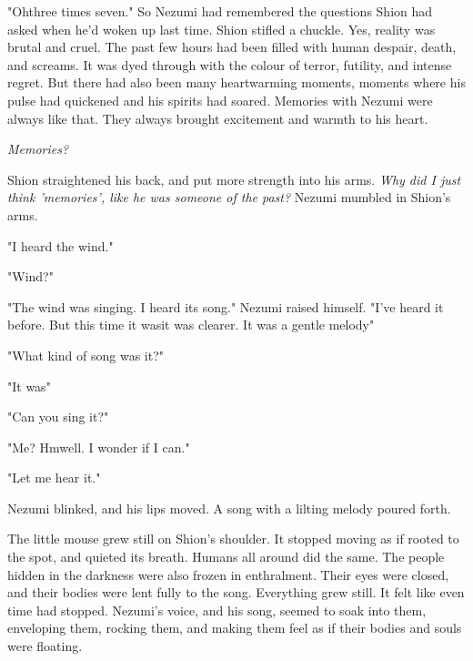"Oh\el three times seven." So Nezumi had remembered the questions Shion
had asked when he'd woken up last time. Shion stifled a chuckle. Yes,
reality was brutal and cruel. The past few hours had been filled with
human despair, death, and screams. It was dyed through with the colour
of terror, futility, and intense regret. But there had also been many
heartwarming moments, moments where his pulse had quickened and his
spirits had soared. Memories with Nezumi were always like that. They
always brought excitement and warmth to his heart.

\emph{Memories?}

Shion straightened his back, and put more strength into his arms. \emph{Why
did I just think 'memories', like he was someone of the past?} Nezumi
mumbled in Shion's arms.

"I heard the wind."

"Wind?"

"The wind was singing. I heard its song." Nezumi raised himself. "I've
heard it before. But this time it was\el it was clearer. It was a gentle
melody\el "

"What kind of song was it?"

"It was\el "

"Can you sing it?"

"Me? Hm\el well. I wonder if I can."

"Let me hear it."

Nezumi blinked, and his lips moved. A song with a lilting melody poured
forth.


The little mouse grew still on Shion's shoulder. It stopped moving as if
rooted to the spot, and quieted its breath. Humans all around did the
same. The people hidden in the darkness were also frozen in enthralment.
Their eyes were closed, and their bodies were lent fully to the song.
Everything grew still. It felt like even time had stopped. Nezumi's
voice, and his song, seemed to soak into them, enveloping them, rocking
them, and making them feel as if their bodies and souls were floating.

